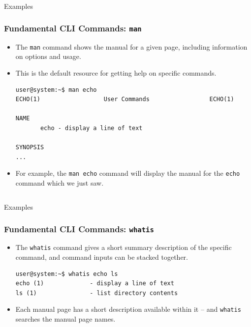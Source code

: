 \documentclass[10pt]{beamer}
\begin{document}
\subsection{}
\begin{frame}[fragile]{Examples}
\frametitle{Fundamental CLI Commands: \texttt{man}}
\begin{itemize}
\item The \texttt{man} command shows the manual for a given page, including information on options and usage.\vspace{0.1in}
\item This is the default resource for getting help on specific commands.\vspace{0.1in}
\begin{lstlisting}[style=BashInputStyle, title=The \texttt{man} Command]
user@system:~$ man echo
ECHO(1)                  User Commands                 ECHO(1)

NAME
       echo - display a line of text

SYNOPSIS
...
\end{lstlisting}
\item For example, the \texttt{man echo} command will display the manual for the \texttt{echo} command which we just saw.\\
\end{itemize}
\end{frame}


\subsection{}
\begin{frame}[fragile]{Examples}
\frametitle{Fundamental CLI Commands: \texttt{whatis}}
\begin{itemize}
\item The \texttt{whatis} command gives a short summary description of the specific command, and command inputs can be stacked together. \vspace{0.2in}
\begin{lstlisting}[style=BashInputStyle,title=The \texttt{whatis} Command]
user@system:~$ whatis echo ls
echo (1)             - display a line of text
ls (1)               - list directory contents
\end{lstlisting}
\vspace{0.1in}
\item Each manual page has a short description available within it -- and \texttt{whatis} searches the manual page names.
\end{itemize}
\end{frame}
\end{document}
